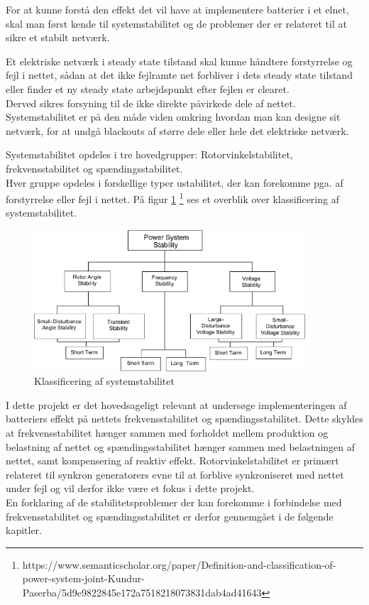 
\label{Systemstabilitet}
For at kunne forstå den effekt det vil have at implementere batterier i et elnet, skal man først kende til systemstabilitet og de problemer der er relateret til at sikre et stabilt netværk.

Et elektriske netværk i steady state tilstand skal kunne håndtere forstyrrelse og fejl i nettet, sådan at det ikke fejlramte net forbliver i dets steady state tilstand eller finder et ny steady state arbejdspunkt efter fejlen er clearet.\\
Derved sikres forsyning til de ikke direkte påvirkede dele af nettet. Systemstabilitet er på den måde viden omkring hvordan man kan designe sit netværk, for at undgå blackouts af større dele eller hele det elektriske netværk.

Systemstabilitet opdeles i tre hovedgrupper: Rotorvinkelstabilitet, frekvensstabilitet og spændingsstabilitet.\\
Hver gruppe opdeles i forskellige typer ustabilitet, der kan forekomme pga. af forstyrrelse eller fejl i nettet. På figur \ref{fig:Overview}
\footnote{https://www.semanticscholar.org/paper/Definition-and-classification-of-power-system-joint-Kundur-Paserba/5d9e9822845e172a7518218073831dab4ad41643}
ses et overblik over klassificering af systemstabilitet.

\begin{figure}[H] %
	\centering
	\includegraphics[width=0.9\textwidth]{figurer/Classification_of_power_system_stability}
	\caption{Klassificering af systemstabilitet}
	\label{fig:Overview}
\end{figure}

I dette projekt er det hovedsageligt relevant at undersøge implementeringen af batteriers effekt på nettets frekvensstabilitet og spændingsstabilitet. Dette skyldes at frekvensstabilitet hænger sammen med forholdet mellem produktion og belastning af nettet og spændingsstabilitet hænger sammen med belastningen af nettet, samt kompensering af reaktiv effekt. Rotorvinkelstabilitet er primært relateret til synkron generatorers evne til at forblive synkroniseret med nettet under fejl og vil derfor ikke være et fokus i dette projekt. \\
En forklaring af de stabilitetsproblemer der kan forekomme i forbindelse med frekvensstabilitet og spændingsstabilitet er derfor gennemgået i de følgende kapitler.